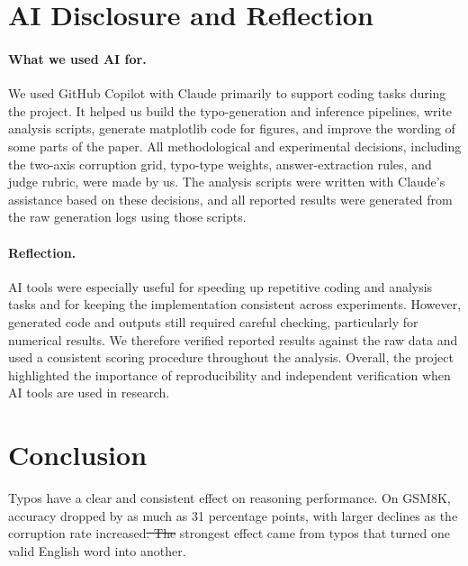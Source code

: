 \documentclass[11pt]{article} %
\makeatletter
\providecommand{\DIFdel}[1]{{\protect\color{red}\sout{#1}}} %
\providecommand{\DIFaddbegin}{} %
\providecommand{\DIFaddend}{} %
\providecommand{\DIFdelbegin}{} %
\providecommand{\DIFdelend}{} %
\providecommand{\DIFscaledelfig}{0.5}
\newlength{\DIFdelgraphicswidth} %
\newlength{\DIFdelgraphicsheight} %
\providecommand{\DIFaddincludegraphics}[2][]{{\color{blue}\fbox{\DIFOincludegraphics[#1]{#2}}}} %
\providecommand{\DIFdelincludegraphics}[2][]{%
\sbox{\DIFdelgraphicsbox}{\DIFOincludegraphics[#1]{#2}}%
\settoboxwidth{\DIFdelgraphicswidth}{\DIFdelgraphicsbox} %
\settoboxtotalheight{\DIFdelgraphicsheight}{\DIFdelgraphicsbox} %
\scalebox{\DIFscaledelfig}{%
\parbox[b]{\DIFdelgraphicswidth}{\usebox{\DIFdelgraphicsbox}\\[-\baselineskip] \rule{\DIFdelgraphicswidth}{0em}}\llap{\resizebox{\DIFdelgraphicswidth}{\DIFdelgraphicsheight}{%
\setlength{\unitlength}{\DIFdelgraphicswidth}%
\begin{picture}(1,1)%
\thicklines\linethickness{2pt} %
{\color[rgb]{1,0,0}\put(0,0){\framebox(1,1){}}}%
{\color[rgb]{1,0,0}\put(0,0){\line( 1,1){1}}}%
{\color[rgb]{1,0,0}\put(0,1){\line(1,-1){1}}}%
\end{picture}%
}\hspace*{3pt}}} %
} %
\DeclareRobustCommand{\DIFaddbegin}{\DIFOaddbegin \let\includegraphics\DIFaddincludegraphics} %
\DeclareRobustCommand{\DIFaddend}{\DIFOaddend \let\includegraphics\DIFOincludegraphics} %
\DeclareRobustCommand{\DIFdelbegin}{\DIFOdelbegin \let\includegraphics\DIFdelincludegraphics} %
\DeclareRobustCommand{\DIFdelend}{\DIFOaddend \let\includegraphics\DIFOincludegraphics} %
\let\sout@orig\sout %
\renewcommand{\sout}[1]{\ifmmode\text{\sout@orig{\ensuremath{#1}}}\else\sout@orig{#1}\fi} %
\providecommand{\DIFaddB}[1]{{\protect\color{blue}\uwave{#1}}}
\makeatother
\begin{document}
\section{AI Disclosure and Reflection}

\paragraph{What we used AI for.}
We used GitHub Copilot with Claude primarily to support coding tasks during the
project. It helped us build the typo-generation and inference pipelines, write
analysis scripts, generate matplotlib code for figures, and improve the wording
of some parts of the paper. All methodological and experimental decisions,
including the two-axis corruption grid, typo-type weights, answer-extraction
rules, and judge rubric, were made by us. The analysis scripts were written with
Claude's assistance based on these decisions, and all reported results were
generated from the raw generation logs using those scripts.

\paragraph{Reflection.}
AI tools were especially useful for speeding up repetitive coding and analysis
tasks and for keeping the implementation consistent across experiments. However,
generated code and outputs still required careful checking, particularly for
numerical results. We therefore verified reported results against the raw data
and used a consistent scoring procedure throughout the analysis. Overall, the
project highlighted the importance of reproducibility and independent
verification when AI tools are used in research.

\section{Conclusion}

Typos have a clear and consistent effect on reasoning performance. On GSM8K,
accuracy dropped by as much as 31 percentage points, with larger declines as the
corruption rate increased\DIFdelbegin \DIFdel{. The }\DIFdelend \DIFaddbegin \DIFaddB{, and the }\DIFaddend strongest effect came from typos that turned
one valid English word into another. \DIFdelbegin %
\end{document}
